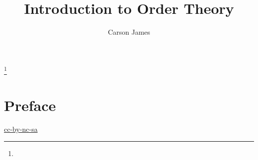 \documentclass{book}
\begin{document}
	
	\frontmatter
	
	\title{Introduction to Order Theory}
	
	
	\author{Carson James}
	\thanks{}
	
	\date{}
	
	\maketitle
	
	
	\setcounter{page}{4}
	
	\tableofcontents
	\printunsrtglossary[type=symbols,style=long,title={Notation}]
	
	
	\mainmatter
	
	\chapter*{Preface}
	
	\begin{flushleft}
		\href{https://creativecommons.org/licenses/by-nc-sa/4.0/legalcode.txt}{cc-by-nc-sa}
	\end{flushleft}
	
	\newpage
	
	
	
	
	
	
	
	
	
	
	
	
	
	
	
	
	
	
	
	
	
	
	
\end{document}
